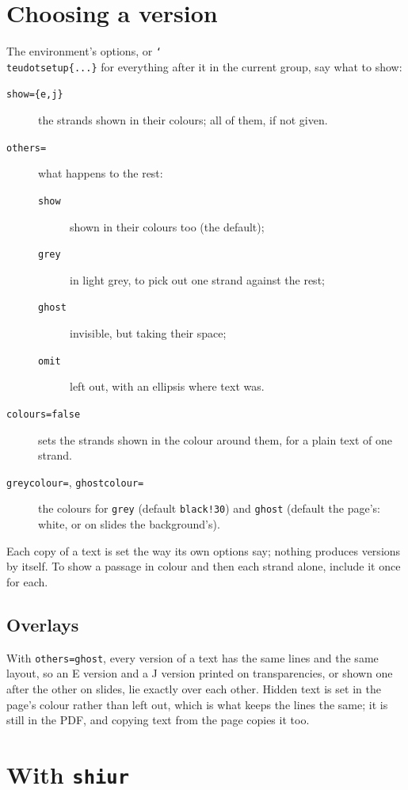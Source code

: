 \documentclass[11pt]{article}
\newcommand{\cs}[1]{\texttt{\char`\\#1}}
\begin{document}
\section{Choosing a version}

The environment's options, or \cs{teudotsetup}\verb|{...}| for everything after it in the
current group, say what to show:
\begin{description}
\item[\texttt{show=\{e,j\}}] the strands shown in their colours; all of them, if not given.
\item[\texttt{others=}] what happens to the rest:
	\begin{description}
	\item[\texttt{show}] shown in their colours too (the default);
	\item[\texttt{grey}] in light grey, to pick out one strand against the rest;
	\item[\texttt{ghost}] invisible, but taking their space;
	\item[\texttt{omit}] left out, with an ellipsis where text was.
	\end{description}
\item[\texttt{colours=false}] sets the strands shown in the colour around them, for a plain
	text of one strand.
\item[\texttt{greycolour=}, \texttt{ghostcolour=}] the colours for \texttt{grey} (default
	\texttt{black!30}) and \texttt{ghost} (default the page's: white, or on slides the
	background's).
\end{description}
Each copy of a text is set the way its own options say; nothing produces versions by itself. To
show a passage in colour and then each strand alone, include it once for each.

\subsection{Overlays}

With \texttt{others=ghost}, every version of a text has the same lines and the same layout, so
an E version and a J version printed on transparencies, or shown one after the other on slides,
lie exactly over each other. Hidden text is set in the page's colour rather than left out, which
is what keeps the lines the same; it is still in the PDF, and copying text from the page copies
it too.

\section{With \texttt{shiur}}\label{sec:shiur}
\end{document}
